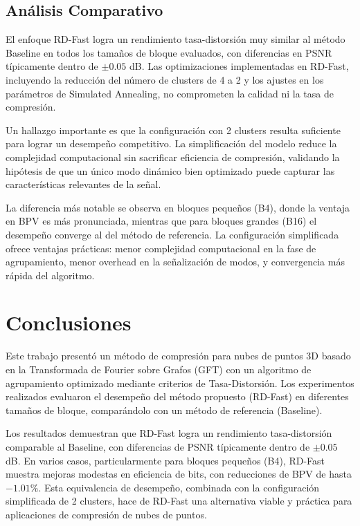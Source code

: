 \subsection{Análisis Comparativo}
El enfoque RD-Fast logra un rendimiento tasa-distorsión muy similar al método Baseline en todos los tamaños de bloque evaluados, con diferencias en PSNR típicamente dentro de $\pm 0.05$ dB. Las optimizaciones implementadas en RD-Fast, incluyendo la reducción del número de clusters de 4 a 2 y los ajustes en los parámetros de Simulated Annealing, no comprometen la calidad ni la tasa de compresión.

Un hallazgo importante es que la configuración con 2 clusters resulta suficiente para lograr un desempeño competitivo. La simplificación del modelo reduce la complejidad computacional sin sacrificar eficiencia de compresión, validando la hipótesis de que un único modo dinámico bien optimizado puede capturar las características relevantes de la señal.

La diferencia más notable se observa en bloques pequeños (B4), donde la ventaja en BPV es más pronunciada, mientras que para bloques grandes (B16) el desempeño converge al del método de referencia. La configuración simplificada ofrece ventajas prácticas: menor complejidad computacional en la fase de agrupamiento, menor overhead en la señalización de modos, y convergencia más rápida del algoritmo.

\section{Conclusiones}
Este trabajo presentó un método de compresión para nubes de puntos 3D basado en la Transformada de Fourier sobre Grafos (GFT) con un algoritmo de agrupamiento optimizado mediante criterios de Tasa-Distorsión. Los experimentos realizados evaluaron el desempeño del método propuesto (RD-Fast) en diferentes tamaños de bloque, comparándolo con un método de referencia (Baseline).

Los resultados demuestran que RD-Fast logra un rendimiento tasa-distorsión comparable al Baseline, con diferencias de PSNR típicamente dentro de $\pm 0.05$ dB. En varios casos, particularmente para bloques pequeños (B4), RD-Fast muestra mejoras modestas en eficiencia de bits, con reducciones de BPV de hasta $-1.01\%$. Esta equivalencia de desempeño, combinada con la configuración simplificada de 2 clusters, hace de RD-Fast una alternativa viable y práctica para aplicaciones de compresión de nubes de puntos.

